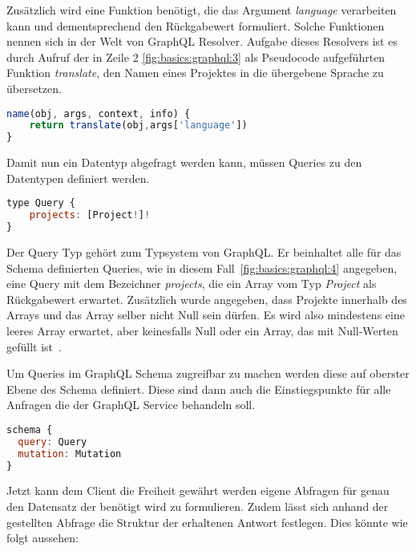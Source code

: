 Zusätzlich wird eine Funktion benötigt, die das Argument \emph{language} verarbeiten kann und dementsprechend den Rückgabewert formuliert.
Solche Funktionen nennen sich in der Welt von GraphQL Resolver.
Aufgabe dieses Resolvers ist es durch Aufruf der in Zeile 2 \ref{fig:basics:graphql:3} als Pseudocode aufgeführten Funktion \emph{translate},
den Namen eines Projektes in die übergebene Sprache zu übersetzen.

\begin{lstlisting}[language=Javascript,float=h!,caption={Resolver des Feldes \emph{name}}, label={fig:basics:graphql:3}]
name(obj, args, context, info) {
    return translate(obj,args['language'])
}
\end{lstlisting}

Damit nun ein Datentyp abgefragt werden kann, müssen Queries zu den Datentypen definiert werden.

\begin{lstlisting}[language=Javascript,float=h!,caption={GraphQL Query Typdefinition}, label={fig:basics:graphql:4}]
type Query {
    projects: [Project!]!
}
\end{lstlisting}

Der Query Typ gehört zum Typsystem von GraphQL. Er beinhaltet alle für das Schema definierten Queries, wie in diesem Fall~\ref{fig:basics:graphql:4} angegeben, eine Query mit dem Bezeichner \emph{projects}, die
ein Array vom Typ \emph{Project} als Rückgabewert erwartet. Zusätzlich wurde angegeben, dass Projekte innerhalb des Arrays und das Array selber nicht Null sein dürfen.
Es wird also mindestens eine leeres Array erwartet, aber keinesfalls Null oder ein Array, das mit Null-Werten gefüllt ist~\cite{graphql}.

Um Queries im GraphQL Schema zugreifbar zu machen werden diese auf oberster Ebene des Schema definiert. Diese sind dann auch die Einstiegspunkte für alle Anfragen die der GraphQL Service behandeln soll.

\begin{lstlisting}[language=Javascript,float=h!,caption={GraphQL Schema}, label={fig:basics:graphql:schema}]
schema {
  query: Query
  mutation: Mutation
}
\end{lstlisting}

Jetzt kann dem Client die Freiheit gewährt werden eigene Abfragen für genau den Datensatz der benötigt wird zu formulieren.
Zudem lässt sich anhand der gestellten Abfrage die Struktur der erhaltenen Antwort festlegen. Dies könnte wie folgt aussehen:

